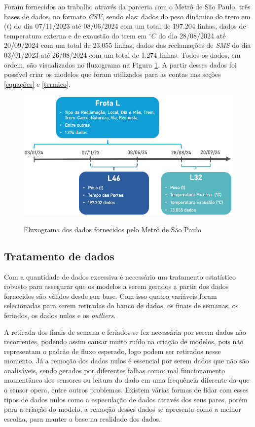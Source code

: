\documentclass[acronym,symbols,table]{fei}
\begin{document}
Foram fornecidos ao trabalho através da parceria com o Metrô de São Paulo, três bases de dados, no formato \textit{CSV}, sendo elas: dados do peso dinâmico do trem em ($t$) do dia 07/11/2023 até 08/06/2024 com um total de 197.204 linhas, dados de temperatura externa e de exaustão do trem em $^{\circ}C$ do dia 28/08/2024 até 20/09/2024 com um total de 23.055 linhas, dados das reclamações de \textit{SMS} do dia 03/01/2023 até 26/08/2024 com um total de 1.274 linhas. Todos os dados, em ordem, são visualizados no fluxograma na Figura \ref{fig:Fluxograma_dos_dados}. A partir desses dados foi possível criar os modelos que foram utilizados para as contas nas seções \ref{equações} e \ref{termico}.

\begin{figure}[!htb]
    \centering
    \caption{Fluxograma dos dados fornecidos pelo Metrô de São Paulo}
    \includegraphics[width=0.8\linewidth]{Imagens/Fluxograma_dos_dados.png} %
    \label{fig:Fluxograma_dos_dados}
\end{figure}
\newpage

\subsection{Tratamento de dados} \label{trata}

Com a quantidade de dados excessiva é necessário um tratamento estatístico robusto para assegurar que os modelos a serem gerados a partir dos dados fornecidos são válidos desde sua base. Com isso quatro variáveis foram selecionadas para serem retiradas do banco de dados, os finais de semanas, os feriados, os dados nulos e os \textit{outliers}.

A retirada dos finais de semana e feriados se fez necessária por serem dados não recorrentes, podendo assim causar muito ruído na criação de modelos, pois não representam o padrão de fluxo esperado, logo podem ser retirados nesse momento. Já a remoção dos dados nulos é essencial por serem dados que não são analisáveis, sendo gerados por diferentes falhas como: mal funcionamento momentâneo dos sensores ou leitura do dado em uma frequência diferente da que o sensor opera, entre outros problemas. Existem várias formas de lidar com esses tipos de dados nulos como a especulação de dados através dos seus pares, porém para a criação do modelo, a remoção desses dados se apresenta como a melhor escolha, para manter a base na realidade dos dados. 
\end{document}
